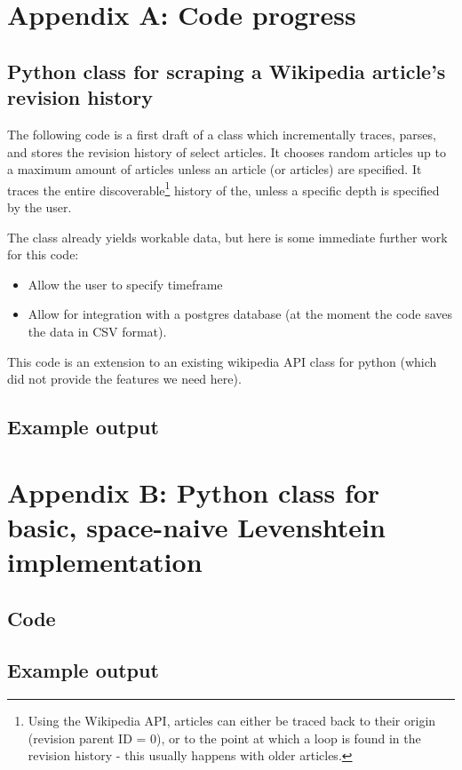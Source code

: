 \documentclass[a4paper,11pt,twoside,notitlepage]{article}
\begin{document}
        
        \clearpage
        \begin{appendices}
          \section{Appendix A: Code progress}
          \subsection{Python class for scraping a Wikipedia article's
            revision history}
          \label{wiki-scrape}
          The following code is a first draft of a class which incrementally
          traces, parses, and stores the revision history of select articles. It
          chooses random articles up to a maximum amount of articles unless an
          article (or articles) are specified. It traces the entire
          discoverable\footnote{Using the Wikipedia API, articles can either be
            traced back to their origin (revision parent ID = 0), or to the
            point at which a loop is found in the revision history - this
            usually happens with older articles.} history of the, unless a
          specific depth is specified by the user.
          
          The class already yields workable data, but here is some immediate
          further work for this code:
          \begin{itemize}
          \item Allow the user to specify timeframe
          \item Allow for integration with a postgres database (at the moment
            the code saves the data in CSV format).
          \end{itemize}
          
          This code is an extension to an existing wikipedia API class for
          python (which did not provide the features we need
          here).\cite{python-wikipedia}
          
          
          \subsection{Example output}
          
          \clearpage
          \section{Appendix B: Python class for basic, space-naive Levenshtein
            implementation}
          \label{levenshtein-implement}
          \subsection{Code}
          
          \subsection{Example output}
        \end{appendices}
        
\end{document}
